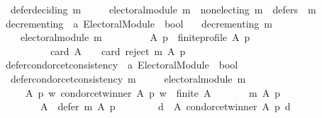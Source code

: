 \begin{isabellebody}
\ \ {\isachardoublequoteopen}defer{\isacharunderscore}{\kern0pt}deciding\ m\ {\isasymequiv}\isanewline
\ \ \ \ electoral{\isacharunderscore}{\kern0pt}module\ m\ {\isasymand}\ non{\isacharunderscore}{\kern0pt}electing\ m\ {\isasymand}\ defers\ {}\ m{\isachardoublequoteclose}\isanewline
\isanewline
\isanewline
{}\isamarkupfalse%
\ decrementing\ {\isacharcolon}{\kern0pt}{\isacharcolon}{\kern0pt}\ {\isachardoublequoteopen}{\isacharprime}{\kern0pt}a\ Electoral{\isacharunderscore}{\kern0pt}Module\ {\isasymRightarrow}\ bool{\isachardoublequoteclose}\ \isanewline
\ \ {\isachardoublequoteopen}decrementing\ m\ {\isasymequiv}\isanewline
\ \ \ \ electoral{\isacharunderscore}{\kern0pt}module\ m\ {\isasymand}\ {\isacharparenleft}{\kern0pt}\isanewline
\ \ \ \ \ \ {\isasymforall}\ A\ p\ {\isachardot}{\kern0pt}\ finite{\isacharunderscore}{\kern0pt}profile\ A\ p\ {\isasymlongrightarrow}\isanewline
\ \ \ \ \ \ \ \ \ \ {\isacharparenleft}{\kern0pt}card\ A\ {\isachargreater}{\kern0pt}\ {}\ {\isasymlongrightarrow}\ card\ {\isacharparenleft}{\kern0pt}reject\ m\ A\ p{\isacharparenright}{\kern0pt}\ {\isasymge}\ {}{\isacharparenright}{\kern0pt}{\isacharparenright}{\kern0pt}{\isachardoublequoteclose}\isanewline
\isanewline
{}\isamarkupfalse%
\ defer{\isacharunderscore}{\kern0pt}condorcet{\isacharunderscore}{\kern0pt}consistency\ {\isacharcolon}{\kern0pt}{\isacharcolon}{\kern0pt}\ {\isachardoublequoteopen}{\isacharprime}{\kern0pt}a\ Electoral{\isacharunderscore}{\kern0pt}Module\ {\isasymRightarrow}\ bool{\isachardoublequoteclose}\ \isanewline
\ \ {\isachardoublequoteopen}defer{\isacharunderscore}{\kern0pt}condorcet{\isacharunderscore}{\kern0pt}consistency\ m\ {\isasymequiv}\isanewline
\ \ \ \ electoral{\isacharunderscore}{\kern0pt}module\ m\ {\isasymand}\isanewline
\ \ \ \ {\isacharparenleft}{\kern0pt}{\isasymforall}\ A\ p\ w{\isachardot}{\kern0pt}\ condorcet{\isacharunderscore}{\kern0pt}winner\ A\ p\ w\ {\isasymand}\ finite\ A\ {\isasymlongrightarrow}\isanewline
\ \ \ \ \ \ {\isacharparenleft}{\kern0pt}m\ A\ p\ {\isacharequal}{\kern0pt}\isanewline
\ \ \ \ \ \ \ \ {\isacharparenleft}{\kern0pt}{\isacharbraceleft}{\kern0pt}{\isacharbraceright}{\kern0pt}{\isacharcomma}{\kern0pt}\isanewline
\ \ \ \ \ \ \ \ A\ {\isacharminus}{\kern0pt}\ {\isacharparenleft}{\kern0pt}defer\ m\ A\ p{\isacharparenright}{\kern0pt}{\isacharcomma}{\kern0pt}\isanewline
\ \ \ \ \ \ \ \ {\isacharbraceleft}{\kern0pt}d\ {\isasymin}\ A{\isachardot}{\kern0pt}\ condorcet{\isacharunderscore}{\kern0pt}winner\ A\ p\ d{\isacharbraceright}{\kern0pt}{\isacharparenright}{\kern0pt}{\isacharparenright}{\kern0pt}{\isacharparenright}{\kern0pt}{\isachardoublequoteclose}\isanewline

\end{isabellebody}
